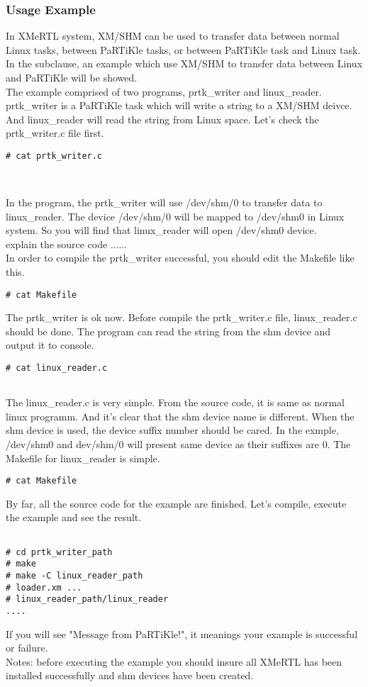\subsubsection{Usage Example}
In XMeRTL system, XM/SHM can be used to transfer data between normal Linux tasks, between PaRTiKle tasks, or between PaRTiKle task and Linux task. In the subclause, an example which use XM/SHM to transfer data between Linux and PaRTiKle will be showed. 
\\
The example comprised of two programs, prtk\_writer and linux\_reader. prtk\_writer is a PaRTiKle task which will write a string to a XM/SHM deivce. And linux\_reader will read the string from Linux space. Let's check the prtk\_writer.c file first.
\begin{lstlisting}
# cat prtk_writer.c



\end{lstlisting}
In the program, the prtk\_writer will use /dev/shm/0 to transfer data to linux\_reader. The device /dev/shm/0 will be mapped to /dev/shm0 in Linux system. So you will find that linux\_reader will open /dev/shm0 device. 
\\
explain the source code ......
\\
In order to compile the prtk\_writer successful, you should edit the Makefile like this.
\begin{lstlisting}
# cat Makefile

\end{lstlisting}

The prtk\_writer is ok now. Before compile the prtk\_writer.c file, linux\_reader.c should be done. The program can read the string from the shm device and output it to console.  

\begin{lstlisting}
# cat linux_reader.c


\end{lstlisting}
The linux\_reader.c is very simple. From the source code, it is same as normal linux programm. And it's clear that the shm device name is different. When the shm device is used, the device suffix number should be cared. In the exmple, /dev/shm0 and dev/shm/0 will present same device as their suffixes are 0. The Makefile for linux\_reader is simple.
\begin{lstlisting}
# cat Makefile

\end{lstlisting}
By far, all the source code for the example are finished. Let's compile, execute the example and see the result.
\begin{verbatim}

# cd prtk_writer_path
# make
# make -C linux_reader_path
# loader.xm ...
# linux_reader_path/linux_reader
....

\end{verbatim}

If you will see "Message from PaRTiKle!", it meanings your example is successful or failure. 
\\

Notes: before executing the example you should insure all XMeRTL has been installed successfully and shm devices have been created.
